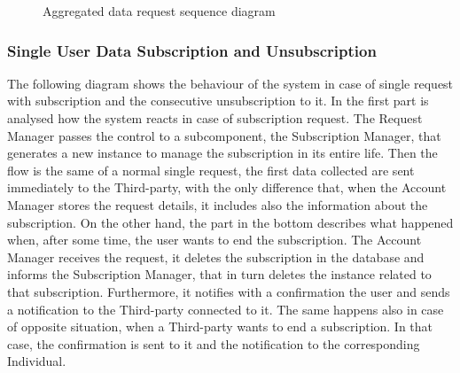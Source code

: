 \begin{figure}[H]
    \centering
    \caption{Aggregated data request sequence diagram}
    \label{fig:log&regDiagram}
\end{figure}

\subsubsection{Single User Data Subscription and Unsubscription}
The following diagram shows the behaviour of the system in case of single request with subscription and the consecutive unsubscription to it.
In the first part is analysed how the system reacts in case of subscription request. The Request Manager passes the control to a subcomponent, the Subscription Manager, that generates a new instance to manage the subscription in its entire life. Then the flow is the same of a normal single request, the first data collected are sent immediately to the Third-party, with the only difference that, when the Account Manager stores the request details, it includes also the information about the subscription.
On the other hand, the part in the bottom describes what happened when, after some time, the user wants to end the subscription. The Account Manager receives the request, it deletes the subscription in the database and informs the Subscription Manager, that in turn deletes the instance related to that subscription.
Furthermore, it notifies with a confirmation the user and sends a notification to the Third-party connected to it.
The same happens also in case of opposite situation, when a Third-party wants to end a subscription. In that case, the confirmation is sent to it and the notification to the corresponding Individual.

